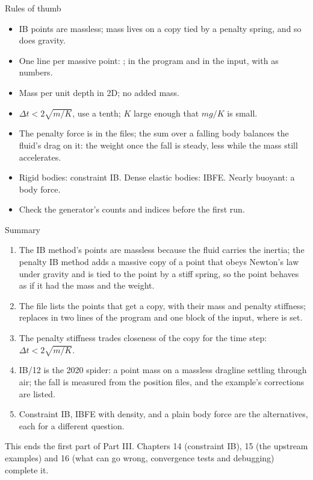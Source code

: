 \documentclass[aspectratio=169,11pt]{beamer}
\begin{document}
\begin{frame}{Rules of thumb}
\label{fr:thumb}
\small
\begin{itemize}
  \item IB points are massless; mass lives on a copy tied by a penalty spring, and so does gravity.
  \item One line per massive point: ;  in the program and in the input, with  as  numbers.
  \item Mass per unit depth in 2D; no added mass.
  \item $\Delta t < 2\sqrt{m/K}$, use a tenth; $K$ large enough that $m g/K$ is small.
  \item The penalty force is in the  files; the sum over a falling body balances the fluid's drag on it: the weight once the fall is steady, less while the mass still accelerates.
  \item Rigid bodies: constraint IB. Dense elastic bodies: IBFE. Nearly buoyant: a body force.
  \item Check the generator's counts and indices before the first run.
\end{itemize}
\end{frame}

\begin{frame}{Summary}
\label{fr:summary}
\footnotesize
\begin{enumerate}
  \item The IB method's points are massless because the fluid carries the inertia; the penalty IB method adds a massive copy of a point that obeys Newton's law under gravity and is tied to the point by a stiff spring, so the point behaves as if it had the mass and the weight.
  \item The  file lists the points that get a copy, with their mass and penalty stiffness;  replaces  in two lines of the program and one block of the input, where  is set.
  \item The penalty stiffness trades closeness of the copy for the time step: $\Delta t < 2\sqrt{m/K}$.
  \item IB/12 is the 2020 spider: a point mass on a massless dragline settling through air; the fall is measured from the position files, and the example's corrections are listed.
  \item Constraint IB, IBFE with density, and a plain body force are the alternatives, each for a different question.
\end{enumerate}
\begin{homebox}
\footnotesize This ends the first part of Part III. Chapters 14 (constraint IB), 15 (the upstream examples) and 16 (what can go wrong, convergence tests and debugging) complete it.
\end{homebox}
\end{frame}
\end{document}
